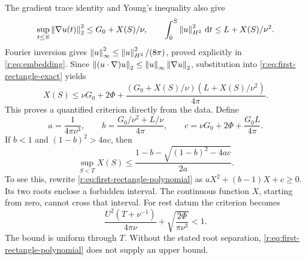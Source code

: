 The gradient trace identity and Young's inequality also give
\[
 \sup_{t\le S}\left\lVert \nabla u(t)\right\rVert_2^2\le G_0+X(S)/\nu,
 \qquad
 \int_0^S\left\lVert u\right\rVert_{H^2}^2\,\mathrm d t\le L+X(S)/\nu^2.
\]
Fourier inversion gives
\(\left\lVert u\right\rVert_\infty^2\le\left\lVert u\right\rVert_{H^2}^2/(8\pi)\), proved explicitly in
\eqref{r:eq:embedding}. Since
\(\left\lVert (u\cdot\nabla)u\right\rVert_2\le\left\lVert u\right\rVert_\infty\left\lVert \nabla u\right\rVert_2\),
substitution into \eqref{r:eq:first-rectangle-exact} yields
\begin{equation}
 X(S)\le\nu G_0+2\Phi+
 \frac{(G_0+X(S)/\nu)(L+X(S)/\nu^2)}{4\pi}.
 \label{r:eq:first-rectangle-polynomial}
\end{equation}
This proves a quantified criterion directly from the data. Define
\[
 a=\frac1{4\pi\nu^3},\qquad
 b=\frac{G_0/\nu^2+L/\nu}{4\pi},\qquad
 c=\nu G_0+2\Phi+\frac{G_0L}{4\pi}.
\]
If \(b<1\) and \((1-b)^2>4ac\), then
\begin{equation}
 \sup_{S<T}X(S)\le
 \frac{1-b-\sqrt{(1-b)^2-4ac}}{2a}.
 \label{r:eq:first-rectangle-root}
\end{equation}
To see this, rewrite \eqref{r:eq:first-rectangle-polynomial} as
\(aX^2+(b-1)X+c\ge0\). Its two roots enclose a forbidden interval.
The continuous function \(X\), starting from zero, cannot cross that interval.
For rest datum the criterion becomes
\[
 \frac{U^2(T+\nu^{-1})}{4\pi\nu}
 +\sqrt{\frac{2\Phi}{\pi\nu^3}}<1.
\]
The bound is uniform through \(T\). Without the stated root separation,
\eqref{r:eq:first-rectangle-polynomial} does not supply an upper bound.
